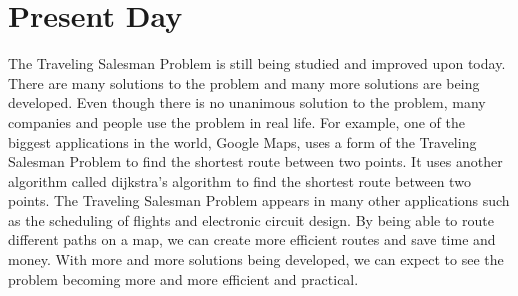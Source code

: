 \documentclass[12pt]{article}
\begin{document}
\section{Present Day}
The Traveling Salesman Problem is still being studied and improved upon today. There are many solutions to the problem and many more solutions are being developed. Even though there is no unanimous solution to the problem, many companies and people use the problem in real life. For example, one of the biggest applications in the world, Google Maps, uses a form of the Traveling Salesman Problem to find the shortest route between two points. It uses another algorithm called dijkstra's algorithm to find the shortest route between two points. The Traveling Salesman Problem appears in many other applications such as the scheduling of flights and electronic circuit design. By being able to route different paths on a map, we can create more efficient routes and save time and money. With more and more solutions being developed, we can expect to see the problem becoming more and more efficient and practical.

\nocite{*}


\end{document}
